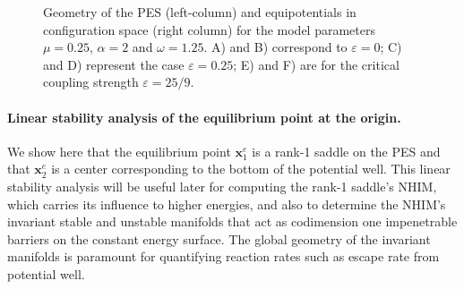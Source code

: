 \documentclass{ws-ijbc}
\begin{document}
\begin{figure}[htbp]
	\caption{Geometry of the PES (left-column) and equipotentials in configuration space  (right column) for the model parameters $\mu = 0.25$, $\alpha = 2$ and $\omega = 1.25$. A) and B) correspond to $\varepsilon = 0$; C) and D) represent the case $\varepsilon = 0.25$; E) and F) are for the critical coupling strength $\varepsilon = 25/9$.}
	\label{figpes_2dof}
\end{figure} 


\paragraph{Linear stability analysis of the equilibrium point at the origin.}
We show here that the equilibrium point $\mathbf{x}_1^e$ is a rank-1 saddle on the PES and that $\mathbf{x}_2^e$ is a center corresponding to the bottom of the potential well. This linear stability analysis will be useful later for computing the rank-1 saddle's NHIM, which carries its influence to higher energies, and also to determine the NHIM's invariant stable and unstable manifolds that act as codimension one impenetrable barriers on the constant energy surface. The global geometry of the invariant manifolds is paramount for quantifying reaction rates such as escape rate from potential well.
\end{document}
